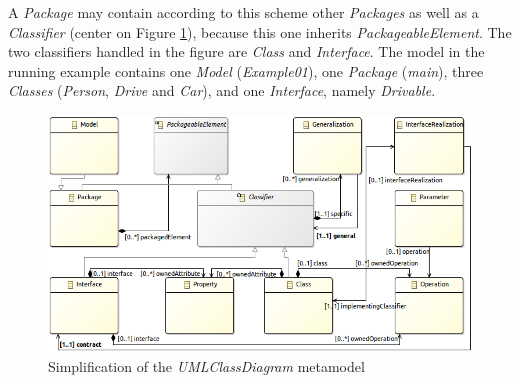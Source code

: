 \documentclass[tuberlin,cic,tc,english,noabntcite]{iiufrgs}
\begin{document}
A \emph{Package} may contain according to this scheme other \emph{Packages} as well as a \emph{Classifier} (center on Figure \ref{fig:uml_metamodel_class}), because this one inherits \emph{PackageableElement}. The two classifiers handled in the figure are \emph{Class} and \emph{Interface}. The model in the running example contains one \emph{Model} (\emph{Example01}), one \emph{Package} (\emph{main}), three \emph{Classes} (\emph{Person}, \emph{Drive} and \emph{Car}), and one \emph{Interface}, namely \emph{Drivable}.

\begin{figure}[H]
    \caption{Simplification of the \emph{UMLClassDiagram} metamodel}
    \begin{center}
        \includegraphics[width=\textwidth]{umlClassDiagramSimple01}
    \end{center}
    \label{fig:uml_metamodel_class}
\end{figure}
\end{document}
